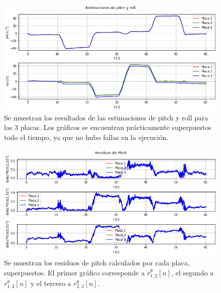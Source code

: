 \begin{figure}[htb]
    \centering
    \includegraphics[width=\textwidth]{img/resultados_pitch_roll_bias_giroscopo.png}
    \caption{Se muestran los resultados de las estimaciones de pitch y roll para las 3 placas. Los gráficos se encuentran prácticamente superpuestos todo el tiempo, ya que no hubo fallas en la ejecución.}
    \label{fig:resultados_pitch_roll_bias_giroscopo}
\end{figure}

\begin{figure}[htb]
    \centering
    \includegraphics[width=\textwidth]{img/resultados_residuos_pitch_bias_giroscopo.png}
    \caption{Se muestran los residuos de pitch calculados por cada placa, superpuestos. El primer gráfico corresponde a $r_{1,2}^{\theta}[n]$, el segundo a $r_{1,3}^{\theta}[n]$ y el tercero a $r_{2,3}^{\theta}[n]$.}
    \label{fig:resultados_residuos_pitch_bias_giroscopo}
\end{figure}

